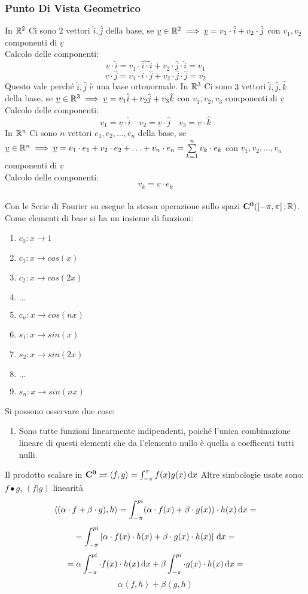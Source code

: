 \subsubsection{Punto Di Vista Geometrico}
In $\mathbb{R}^2$ Ci sono $2$ vettori $\hat{i},\hat{j}$ della base, se $\underline{v}\in \mathbb{R}^2 \implies \underline{v}=v_1\cdot \hat{i}+v_2\cdot \hat{j}$ con $v_1,v_2$ componenti di $\underline{v}$\\
Calcolo delle componenti:
\[\underline{v}\cdot \hat{i} = v_1\cdot \hat{i\cdot }\hat{i}+v_2\cdot \hat{j}\cdot \hat{i}=v_1\]
\[\underline{v}\cdot \hat{j} = v_1\cdot \hat{i}\cdot \hat{j}+v_2\cdot \hat{j}\cdot \hat{j}=v_2\]
Questo vale perché $\hat{i},\hat{j}$ è una base ortonormale.
In $\mathbb{R}^3$ Ci sono $3$ vettori $\hat{i},\hat{j},\hat{k}$ della base, se $\underline{v}\in \mathbb{R}^3 \implies \underline{v}=v_1\hat{i}+v_2\hat{j}+v_3\hat{k}$ con $v_1,v_2,v_3$ componenti di $\underline{v}$\\
Calcolo delle componenti:
\[ v_1=\underline{v}\cdot \hat{i}\quad v_2=\underline{v}\cdot \hat{j}\quad v_3=\underline{v}\cdot \hat{k}  \]
In $\mathbb{R}^n$ Ci sono $n$ vettori $e_1,e_2,\dotsc,e_n$ della base, se $\underline{v}\in \mathbb{R}^n \implies \underline{v}=v_1\cdot e_1+v_2\cdot e_2+\ldots+v_n\cdot e_n=\sum\limits_{k=1}^{n}v_k\cdot e_k$ con $v_1,v_2,\dotsc,v_n$ componenti di $\underline{v}$\\
Calcolo delle componenti:
\[v_k=\underline{v}\cdot e_k\]
\\
Con le Serie di Fourier su esegue la stessa operazione sullo spazi $\mathbf{C^{0}}(\left[-\pi,\pi\right]; \mathbb{R})$. Come elementi di base si ha un insieme di funzioni:
\begin{enumerate}
	\item $c_0:x\to 1$
	\item $c_1:x\to cos(x)$
	\item $c_2:x\to cos(2x)$
	\item $\ldots$
	\item $c_n:x\to cos(nx)$
	\item $s_1:x\to sin(x)$
	\item $s_2:x\to sin(2x)$
	\item $\ldots$
	\item $s_n:x\to sin(nx)$
\end{enumerate}
Si possono osservare due cose:
\begin{enumerate}
	\item Sono tutte funzioni linearmente indipendenti, poiché l'unica combinazione lineare di questi elementi che da l'elemento nullo è quella a coefficenti tutti nulli.
\end{enumerate}
Il prodotto scalare in $\mathbf{C^{0}} \rightleftharpoons \left<f,g\right>=\int_{-\pi}^{\pi}f(x)g(x)\,\mathrm{d}{x}$
Altre simbologie usate sono: $ f\bullet g $, $(f|g)$
\observation linearità
\[\left<(\alpha\cdot f+\beta\cdot g), h \right>= \int_{-\pi}^{pi} (\alpha\cdot f(x)+\beta\cdot g(x))\cdot h(x) \,\mathrm{d}{x}=\]
\[=\int_{-\pi}^{pi} \left[\alpha\cdot f(x)\cdot h(x)+\beta\cdot g(x)\cdot h(x) \right]\,\mathrm{d}{x}= \]
\[=\alpha\int_{-\pi}^{pi} \cdot f(x)\cdot h(x) \,\mathrm{d}{x}+\beta\int_{-\pi}^{pi} \cdot g(x)\cdot h(x) \,\mathrm{d}{x} =\]
\[\alpha\left<f,h\right>+\beta\left<g,h\right>\]

